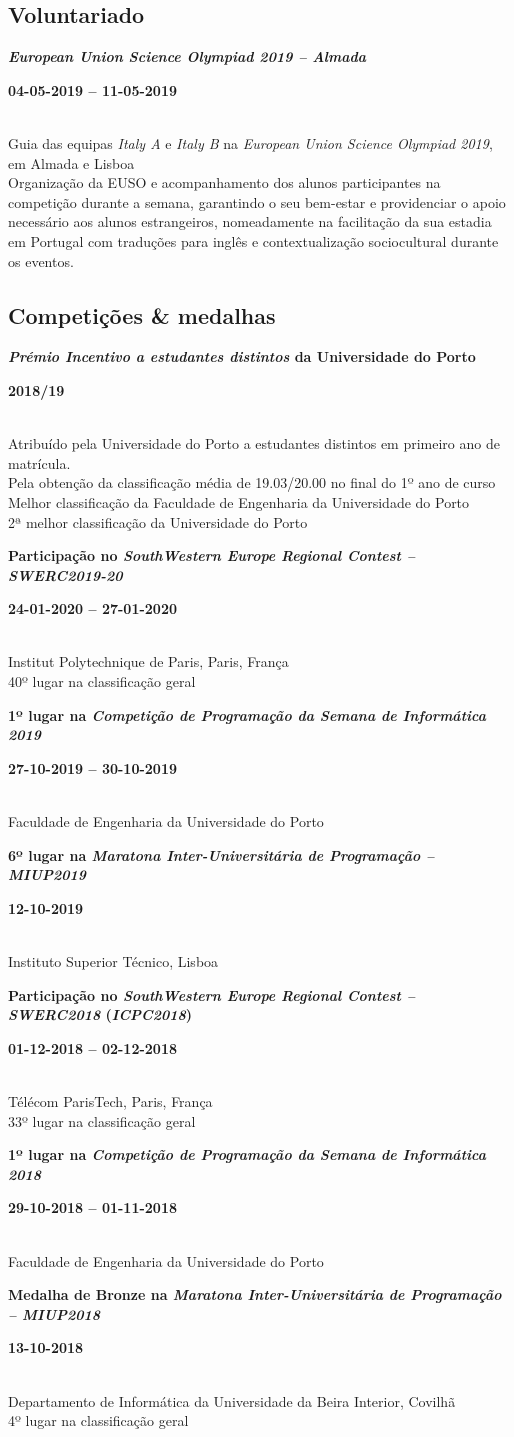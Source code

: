 \documentclass[8pt]{extarticle}
\newcommand{\parag}[1]{
\begin{minipage}{\textwidth} \hfill
\begin{minipage}{\dimexpr\textwidth-0.6cm}
	#1
\end{minipage}
\end{minipage}
}
\newcommand{\itemtime}[2]{
#1 \hfill \begin{minipage}[t]{0.185\textwidth}         #2  \end{minipage}
}
\newcommand{\job}[3]{\parag{
\itemtime{\textbf{#1}}{\textbf{#2}}\\
#3 \vspace*{9px}}}
\begin{document}
\subsection*{Voluntariado}
\job{\textit{European Union Science Olympiad 2019 – Almada}}{04-05-2019 – 11-05-2019}{
Guia das equipas \textit{Italy A} e \textit{Italy B} na \textit{European Union Science Olympiad 2019}, em Almada e Lisboa\\
Organização da EUSO e acompanhamento dos alunos participantes na competição durante a semana, garantindo o seu bem-estar e providenciar o apoio necessário aos alunos estrangeiros, nomeadamente na facilitação da sua estadia em Portugal com traduções para inglês e contextualização sociocultural durante os eventos.
}
\subsection*{Competições \& medalhas}
\job{\textit{Prémio Incentivo a estudantes distintos} da Universidade do Porto}{2018/19}{
Atribuído pela Universidade do Porto a estudantes distintos em primeiro ano de matrícula.\\
Pela obtenção da classificação média de 19.03/20.00 no final do 1º ano de curso\\
Melhor classificação da Faculdade de Engenharia da Universidade do Porto\\
2ª melhor classificação da Universidade do Porto
}
\job{Participação no \textit{SouthWestern Europe Regional Contest – SWERC2019-20}}{24-01-2020 – 27-01-2020}{
Institut Polytechnique de Paris, Paris, França\\
40º lugar na classificação geral
}
\job{1º lugar na \textit{Competição de Programação da Semana de Informática 2019}}{27-10-2019 – 30-10-2019}{
Faculdade de Engenharia da Universidade do Porto
}
\job{6º lugar na \textit{Maratona Inter-Universitária de Programação – MIUP2019}}{12-10-2019}{
Instituto Superior Técnico, Lisboa
}
\job{Participação no \textit{SouthWestern Europe Regional Contest – SWERC2018} (\textit{ICPC2018})}{01-12-2018 – 02-12-2018}{
Télécom ParisTech, Paris, França\\
33º lugar na classificação geral
}
\job{1º lugar na \textit{Competição de Programação da Semana de Informática 2018}}{29-10-2018 – 01-11-2018}{
Faculdade de Engenharia da Universidade do Porto
}
\job{Medalha de Bronze na \textit{Maratona Inter-Universitária de Programação – MIUP2018}}{13-10-2018}{
Departamento de Informática da Universidade da Beira Interior, Covilhã\\
4º lugar na classificação geral
}
\end{document}
